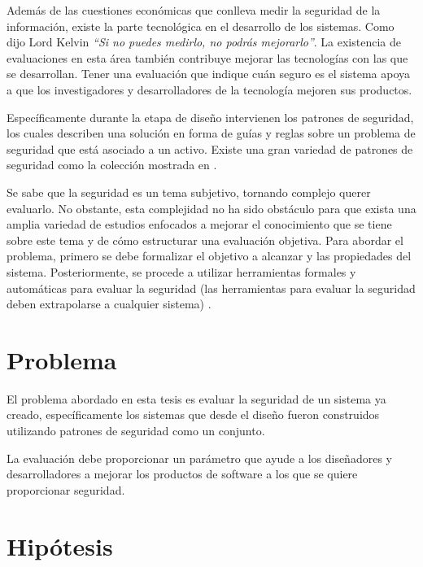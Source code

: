 \vspace{0.3cm}

Además de las cuestiones económicas que conlleva medir la seguridad de la información, existe la parte tecnológica en el desarrollo de los sistemas. Como dijo Lord Kelvin \textit{``Si no puedes medirlo, no podrás mejorarlo''}. La existencia de evaluaciones en esta área también contribuye mejorar las tecnologías con las que se desarrollan. Tener una evaluación que indique cuán seguro es el sistema apoya a que los investigadores y desarrolladores de la tecnología mejoren sus productos.

\vspace{0.3cm}

Específicamente durante la etapa de diseño intervienen los patrones de seguridad, los cuales describen una solución en forma de guías y reglas sobre un problema de seguridad que está asociado a un activo. Existe una gran variedad de patrones de seguridad como la colección mostrada en \cite{SchFerHyb06}.  

\vspace{0.3cm}

Se sabe que la seguridad es un tema subjetivo, tornando complejo querer evaluarlo. No obstante, esta complejidad no ha sido obstáculo para que exista una amplia variedad de estudios enfocados a mejorar el conocimiento que se tiene sobre este tema y de cómo estructurar una evaluación objetiva. Para abordar el problema, primero se debe formalizar el objetivo a alcanzar y las propiedades del sistema. Posteriormente, se procede a utilizar herramientas formales y automáticas para evaluar la seguridad (las herramientas para evaluar la seguridad deben extrapolarse a cualquier sistema) \cite{AtzLio0605}. 

\section{Problema}

El problema abordado en esta tesis es evaluar la seguridad de un sistema ya creado, específicamente los sistemas que desde el diseño fueron construidos utilizando patrones de seguridad como un conjunto. 

\vspace{0.3cm}

La evaluación debe proporcionar un parámetro que ayude a los diseñadores y desarrolladores a mejorar los productos de software a los que se quiere proporcionar seguridad. 

\section{Hipótesis}

